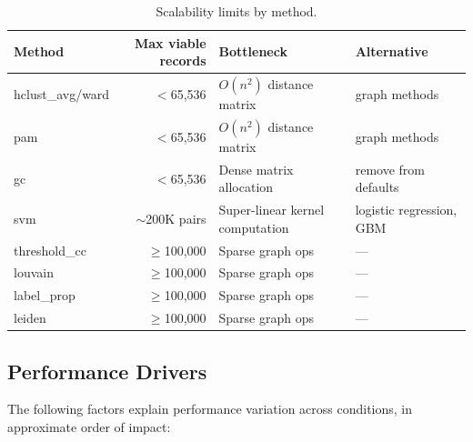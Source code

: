 \documentclass[11pt, a4paper]{article}
\begin{document}
\begin{table}[h!]
\centering
\small
\begin{tabular}{lrll}
\toprule
\textbf{Method} & \textbf{Max viable records} & \textbf{Bottleneck} & \textbf{Alternative} \\
\midrule
hclust\_avg/ward & $<$65,536 & $O(n^2)$ distance matrix & graph methods \\
pam              & $<$65,536 & $O(n^2)$ distance matrix & graph methods \\
gc               & $<$65,536 & Dense matrix allocation   & remove from defaults \\
svm              & $\sim$200K pairs & Super-linear kernel computation & logistic regression, GBM \\
threshold\_cc    & $\geq$100,000 & Sparse graph ops & --- \\
louvain          & $\geq$100,000 & Sparse graph ops & --- \\
label\_prop      & $\geq$100,000 & Sparse graph ops & --- \\
leiden           & $\geq$100,000 & Sparse graph ops & --- \\
\bottomrule
\end{tabular}
\caption{Scalability limits by method.}
\end{table}

\subsection{Performance Drivers}

The following factors explain performance variation across conditions,
in approximate order of impact:
\end{document}
